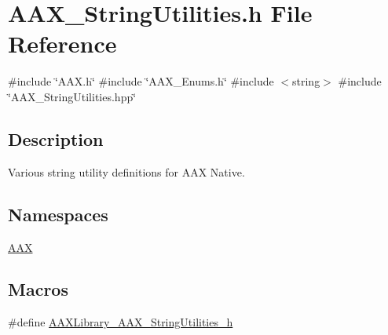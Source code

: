 \hypertarget{a00677}{}\section{A\+A\+X\+\_\+\+String\+Utilities.\+h File Reference}
\label{a00677}
{\ttfamily \#include \char`\"{}A\+A\+X.\+h\char`\"{}}\newline
{\ttfamily \#include \char`\"{}A\+A\+X\+\_\+\+Enums.\+h\char`\"{}}\newline
{\ttfamily \#include $<$string$>$}\newline
{\ttfamily \#include \char`\"{}A\+A\+X\+\_\+\+String\+Utilities.\+hpp\char`\"{}}\newline


\subsection{Description}
Various string utility definitions for A\+AX Native. 

\subsection*{Namespaces}
\begin{DoxyCompactItemize}
\item 
 \mbox{\hyperlink{a00852}{A\+AX}}
\end{DoxyCompactItemize}
\subsection*{Macros}
\begin{DoxyCompactItemize}
\item 
\#define \mbox{\hyperlink{a00677_aea61cbef0d0ebbae3c538af4531460df}{A\+A\+X\+Library\+\_\+\+A\+A\+X\+\_\+\+String\+Utilities\+\_\+h}}
\end{DoxyCompactItemize}
